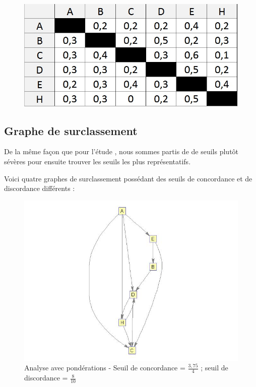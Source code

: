 \documentclass[a4paper,10pt]{article}
\begin{document}
\begin{figure}[h]
\begin{center}
\includegraphics[scale=0.3]{img/AD-Discordance.jpg}
\end{center}
\end{figure}

\subsection{Graphe de surclassement}

De la même façon que pour l'étude , nous sommes partis de de seuils plutôt sévères pour ensuite trouver les seuils les plus représentatifs.

Voici quatre graphes de surclassement possédant des seuils de concordance et de discordance différents :

\begin{figure}[H]
\begin{center}
\includegraphics[scale=0.3]{img/G1-pond.jpg}
\caption{Analyse avec pondérations - Seuil de concordance = $\frac{3,75}{4}$ ; seuil de discordance = $\frac{8}{10}$}
\end{center}
\end{figure}
\end{document}
